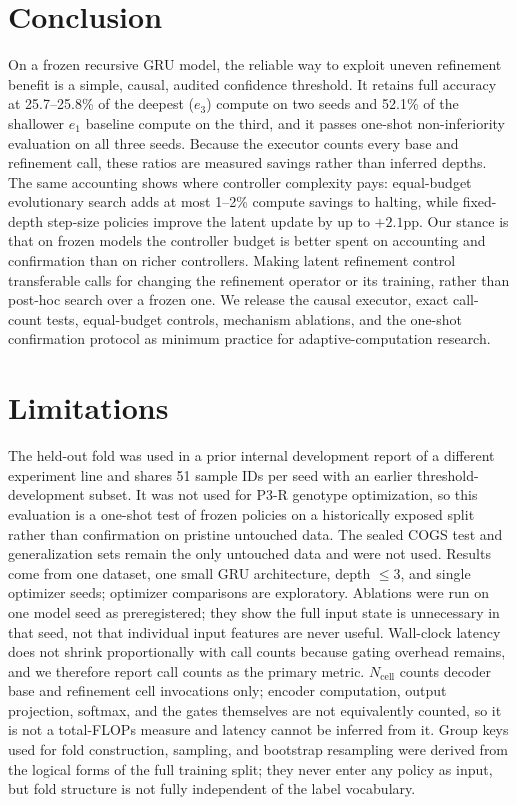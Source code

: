 \documentclass[11pt]{article}
\begin{document}
\section{Conclusion}
\label{sec:conclusion}
On a frozen recursive GRU model, the reliable way to exploit uneven refinement benefit is a simple, causal, audited confidence threshold. It retains full accuracy at 25.7--25.8\% of the deepest ($e_3$) compute on two seeds and 52.1\% of the shallower $e_1$ baseline compute on the third, and it passes one-shot non-inferiority evaluation on all three seeds. Because the executor counts every base and refinement call, these ratios are measured savings rather than inferred depths. The same accounting shows where controller complexity pays: equal-budget evolutionary search adds at most 1--2\% compute savings to halting, while fixed-depth step-size policies improve the latent update by up to $+2.1$pp. Our stance is that on frozen models the controller budget is better spent on accounting and confirmation than on richer controllers. Making latent refinement control transferable calls for changing the refinement operator or its training, rather than post-hoc search over a frozen one. We release the causal executor, exact call-count tests, equal-budget controls, mechanism ablations, and the one-shot confirmation protocol as minimum practice for adaptive-computation research.

\section*{Limitations}
The held-out fold was used in a prior internal development report of a different experiment line and shares 51 sample IDs per seed with an earlier threshold-development subset. It was not used for P3-R genotype optimization, so this evaluation is a one-shot test of frozen policies on a historically exposed split rather than confirmation on pristine untouched data. The sealed COGS test and generalization sets remain the only untouched data and were not used. Results come from one dataset, one small GRU architecture, depth $\leq 3$, and single optimizer seeds; optimizer comparisons are exploratory. Ablations were run on one model seed as preregistered; they show the full input state is unnecessary in that seed, not that individual input features are never useful. Wall-clock latency does not shrink proportionally with call counts because gating overhead remains, and we therefore report call counts as the primary metric. $N_{\mathrm{cell}}$ counts decoder base and refinement cell invocations only; encoder computation, output projection, softmax, and the gates themselves are not equivalently counted, so it is not a total-FLOPs measure and latency cannot be inferred from it. Group keys used for fold construction, sampling, and bootstrap resampling were derived from the logical forms of the full training split; they never enter any policy as input, but fold structure is not fully independent of the label vocabulary.
\end{document}
